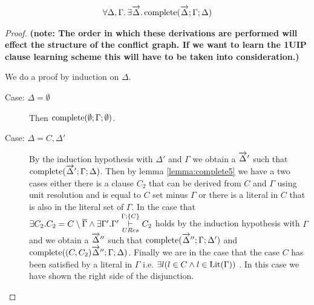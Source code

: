 \begin{mylemma}
\begin{align*}
\forall \Delta,\Gamma. \, \exists \overrightarrow{\Delta}. \, \mathrm{complete}(\overrightarrow{\Delta};\Gamma; \Delta)
\end{align*}
\begin{proof}
\textbf{(note: The order in which these derivations are performed will effect the structure of the conflict graph. If we want to learn the 1UIP clause learning scheme this will have to be taken into  consideration.)}

We do a proof by induction on $\Delta$.

\begin{description}

\item[Case: $\Delta = \emptyset$] Then $\mathrm{complete}(\emptyset;\Gamma; \emptyset)$.
\item[Case: $\Delta = C, \Delta'$] By the induction hypothesis with $\Delta'$ and $\Gamma$ we obtain a $\overrightarrow{\Delta}'$ such that $\mathrm{complete}(\overrightarrow{\Delta}';\Gamma; \Delta)$. Then by lemma \ref{lemma:complete5} we have a two cases either there is a clause $C_2$ that can be derived from $C$ and $\Gamma$ using unit resolution and is equal to $C$ set minus $\Gamma$ or there is a literal in $C$ that is also in the literal set of $\Gamma$. In the case that   $\exists C_2. C_2 = C \setminus \overline{\Gamma} \wedge \exists \Gamma' . \Gamma' \overset{\Gamma;\{C \}}{\underset{URes}{\vdash}} C_2$  holds by the induction hypothesis with $\Gamma$ and we obtain a $\overrightarrow{\Delta}''$ such that $\mathrm{complete}(\overrightarrow{\Delta}'';\Gamma; \Delta')$ and $\mathrm{complete}((C, C_2) \overrightarrow{\Delta}'';\Gamma; \Delta)$. Finally we are in the case that the case $C$ has been satisfied by a literal in $\Gamma$ i.e. $\exists l (l \in C \wedge l \in \mathrm{Lit}(\Gamma))$ . In this case we have shown the right side of the disjunction.
\end{description}

\end{proof}
\end{mylemma}


